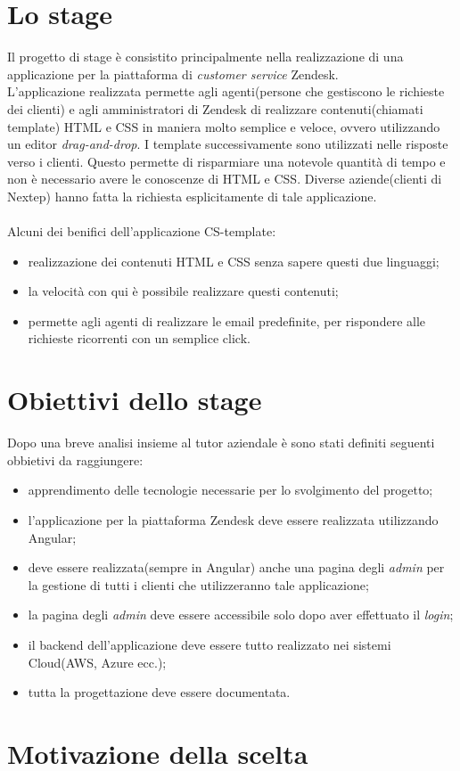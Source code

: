 \section{Lo stage}
Il progetto di stage è consistito principalmente nella realizzazione di una applicazione per la piattaforma di \emph{customer service} Zendesk. \\ L'applicazione realizzata permette agli agenti(persone che gestiscono le richieste dei clienti) e agli amministratori di Zendesk di realizzare contenuti(chiamati template) HTML e CSS in maniera molto semplice e veloce, ovvero utilizzando un editor \emph{drag-and-drop}. I template successivamente sono utilizzati nelle risposte verso i clienti. Questo permette di risparmiare una notevole quantità di tempo e non è necessario avere le conoscenze di HTML e CSS. Diverse aziende(clienti di Nextep) hanno fatta la richiesta esplicitamente di tale applicazione.
\\
\\
Alcuni dei benifici dell'applicazione CS-template:
\begin{itemize}
	\item realizzazione dei contenuti HTML e CSS senza sapere questi due linguaggi;
	\item la velocità con qui è possibile realizzare questi contenuti;
	\item permette agli agenti di realizzare le email predefinite, per rispondere alle richieste ricorrenti con un semplice click.
\end{itemize}
\newpage
\section{ Obiettivi dello stage}
Dopo una breve analisi insieme al tutor aziendale è sono stati definiti  seguenti obbietivi da raggiungere: 
\begin{itemize}
	\item apprendimento delle tecnologie necessarie per lo svolgimento del progetto;
	\item l'applicazione per la piattaforma Zendesk deve essere realizzata utilizzando Angular; 
	\item deve essere realizzata(sempre in Angular) anche una pagina degli \emph{admin} per la gestione di tutti i clienti che utilizzeranno tale applicazione;
	\item la pagina degli \emph{admin} deve essere accessibile solo dopo aver effettuato il \emph{login};
	\item il backend dell'applicazione deve essere tutto realizzato nei sistemi Cloud(AWS, Azure ecc.);
	\item tutta la progettazione deve essere documentata.
\end{itemize} 

\section{Motivazione della scelta}
